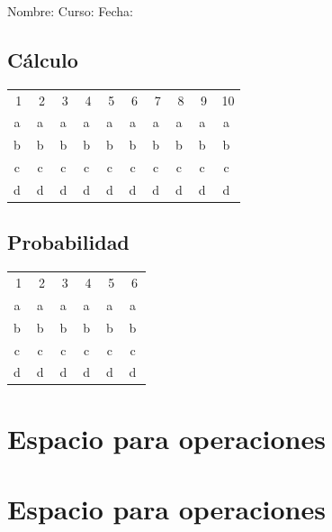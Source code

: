 \documentclass[10pt,twoside]{article}
\begin{document}
Nombre: \hrulefill Curso: \underline{\hspace{1cm}}  Fecha: \underline{\hspace{2cm}}\\
\begin{center}
\subsection*{Cálculo}
\begin{tabular}[scale=1.3]{|cccccccccc|}\hline
1 & 2 & 3 & 4 & 5 & 6 & 7 & 8 & 9 & 10\\
\textcircled{a} &\textcircled{a}&\textcircled{a}&\textcircled{a}&\textcircled{a} & \textcircled{a} & \textcircled{a}&\textcircled{a}&\textcircled{a}&\textcircled{a}\\
\textcircled{b}&\textcircled{b}&\textcircled{b}&\textcircled{b}&\textcircled{b} &\textcircled{b}&\textcircled{b}&\textcircled{b}&\textcircled{b}&\textcircled{b}\\
\textcircled{c}&\textcircled{c}&\textcircled{c}&\textcircled{c}&\textcircled{c}&\textcircled{c}&\textcircled{c}&\textcircled{c}&\textcircled{c}&\textcircled{c}\\
\textcircled{d}&\textcircled{d}&\textcircled{d}&\textcircled{d}&\textcircled{d}&\textcircled{d}&\textcircled{d}&\textcircled{d}&\textcircled{d}&\textcircled{d}\\\hline
\end{tabular}
\end{center}
\begin{center}
\subsection*{Probabilidad}
\begin{tabular}[scale=1.3]{|cccccc|}\hline
1 & 2 & 3 & 4 & 5 & 6\\
\textcircled{a}&\textcircled{a}&\textcircled{a}&\textcircled{a}&\textcircled{a}&\textcircled{a}\\
\textcircled{b}&\textcircled{b}&\textcircled{b}&\textcircled{b}&\textcircled{b}&\textcircled{b}\\
\textcircled{c}&\textcircled{c}&\textcircled{c}&\textcircled{c}&\textcircled{c}&\textcircled{c}\\
\textcircled{d}&\textcircled{d}&\textcircled{d}&\textcircled{d}&\textcircled{d}&\textcircled{d}\\\hline
\end{tabular}
\end{center}
\section*{Espacio para operaciones}
\newpage
\section*{Espacio para operaciones}
\end{document}
